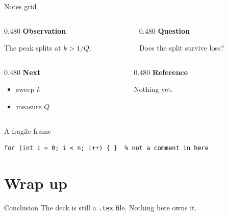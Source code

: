\documentclass{beamer}
\begin{document}
\begin{frame}{Notes grid}
\begin{columns}[t]
\begin{column}{0.480\textwidth}
\textbf{Observation}

The peak splits at $k > 1/Q$.
\end{column}
\begin{column}{0.480\textwidth}
\textbf{Question}

Does the split survive loss?
\end{column}
\end{columns}

\vfill

\begin{columns}[t]
\begin{column}{0.480\textwidth}
\textbf{Next}
\begin{itemize}
  \item sweep $k$
  \item measure $Q$
\end{itemize}
\end{column}
\begin{column}{0.480\textwidth}
\textbf{Reference}

Nothing yet.
\end{column}
\end{columns}
\end{frame}


\begin{frame}[fragile]{A fragile frame}
\begin{verbatim}
for (int i = 0; i < n; i++) { }  % not a comment in here
\end{verbatim}
\end{frame}

\section{Wrap up}

\begin{frame}{Conclusion}
  The deck is still a \texttt{.tex} file. Nothing here owns it.
\end{frame}
\end{document}
